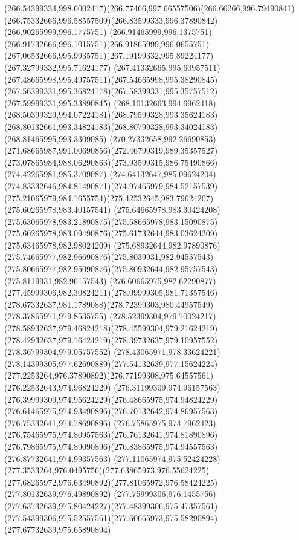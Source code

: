 {{\curveto(266.54399334,998.6002417)(266.77466,997.66557506)(266.66266,996.79490841)
\curveto(266.75332666,996.58557509)(266.83599333,996.37890842)(266.90265999,996.1775751)
\curveto(266.91465999,996.1375751)(266.91732666,996.1015751)(266.91865999,996.0655751)
\curveto(267.06532666,995.9935751)(267.19199332,995.89224177)(267.32799332,995.71624177)
\curveto(267.41332665,995.60957511)(267.48665998,995.49757511)(267.54665998,995.38290845)
\curveto(267.56399331,995.36824178)(267.58399331,995.35757512)(267.59999331,995.33890845)
\curveto(268.10132663,994.6962418)(268.50399329,994.07224181)(268.79599328,993.35624183)
\curveto(268.80132661,993.34824183)(268.80799328,993.34024183)(268.81465995,993.3309085)
\curveto(270.27332658,992.26690853)(271.68665987,991.00690856)(272.46799319,989.35357527)
\curveto(273.07865984,988.06290863)(273.93599315,986.75490866)(274.42265981,985.3709087)
\curveto(274.64132647,985.09624204)(274.83332646,984.81490871)(274.97465979,984.52157539)
\curveto(275.21065979,984.1655754)(275.42532645,983.79624207)(275.60265978,983.40157541)
\curveto(275.64665978,983.30424208)(275.63065978,983.21890875)(275.58665978,983.15090875)
\curveto(275.60265978,983.09490876)(275.61732644,983.03624209)(275.63465978,982.98024209)
\curveto(275.68932644,982.97890876)(275.74665977,982.96690876)(275.8039931,982.94557543)
\curveto(275.80665977,982.95090876)(275.80932644,982.95757543)(275.8119931,982.96157543)
\curveto(276.60665975,982.62290877)(277.45999306,982.30824211)(278.09999305,981.71357546)
\curveto(278.67332637,981.1789088)(278.72399303,980.44957549)(278.37865971,979.8535755)
\curveto(278.52399304,979.70024217)(278.58932637,979.46824218)(278.45599304,979.21624219)
\curveto(278.42932637,979.16424219)(278.39732637,979.10957552)(278.36799304,979.05757552)
\curveto(278.43065971,978.33624221)(278.14399305,977.62690889)(277.54132639,977.15624224)
\curveto(277.2253264,976.37890892)(276.77199308,975.64557561)(276.22532643,974.96824229)
\curveto(276.31199309,974.96157563)(276.39999309,974.95624229)(276.48665975,974.94824229)
\curveto(276.61465975,974.93490896)(276.70132642,974.86957563)(276.75332641,974.78690896)
\curveto(276.75865975,974.7962423)(276.75465975,974.80957563)(276.76132641,974.81890896)
\curveto(276.79865975,974.89090896)(276.83865975,974.94557563)(276.87732641,974.99357563)
\curveto(277.11065974,975.52424228)(277.3533264,976.0495756)(277.63865973,976.55624225)
\curveto(277.68265972,976.63490892)(277.81065972,976.58424225)(277.80132639,976.49890892)
\curveto(277.75999306,976.1455756)(277.63732639,975.80424227)(277.48399306,975.47357561)
\curveto(277.54399306,975.52557561)(277.60665973,975.58290894)(277.67732639,975.65890894)
}}
